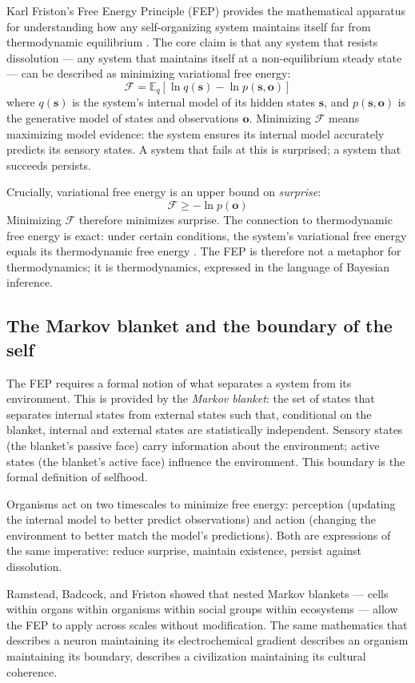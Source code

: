 \documentclass[12pt, a4paper]{article}
\newcommand{\FEP}{\mathcal{F}}
\begin{document}
Karl Friston's Free Energy Principle (FEP) provides the mathematical apparatus for
understanding how any self-organizing system maintains itself far from thermodynamic
equilibrium \citep{friston2010, friston2019}. The core claim is that any system that
resists dissolution --- any system that maintains itself at a non-equilibrium steady state
--- can be described as minimizing variational free energy:
\[
\FEP = \mathbb{E}_q\!\left[\ln q(\mathbf{s}) - \ln p(\mathbf{s},\mathbf{o})\right]
\]
where $q(\mathbf{s})$ is the system's internal model of its hidden states $\mathbf{s}$, and
$p(\mathbf{s},\mathbf{o})$ is the generative model of states and observations $\mathbf{o}$.
Minimizing $\FEP$ means maximizing model evidence: the system ensures its internal model
accurately predicts its sensory states. A system that fails at this is surprised; a system
that succeeds persists.

Crucially, variational free energy is an upper bound on \textit{surprise}:
\[
\FEP \geq -\ln p(\mathbf{o})
\]
Minimizing $\FEP$ therefore minimizes surprise. The connection to thermodynamic free energy
is exact: under certain conditions, the system's variational free energy equals its
thermodynamic free energy \citep{friston2019}. The FEP is therefore not a metaphor for
thermodynamics; it is thermodynamics, expressed in the language of Bayesian inference.

\subsection{The Markov blanket and the boundary of the self}

The FEP requires a formal notion of what separates a system from its environment. This is
provided by the \textit{Markov blanket}: the set of states that separates internal states
from external states such that, conditional on the blanket, internal and external states are
statistically independent. Sensory states (the blanket's passive face) carry information
about the environment; active states (the blanket's active face) influence the environment.
This boundary is the formal definition of selfhood.

Organisms act on two timescales to minimize free energy: perception (updating the internal
model to better predict observations) and action (changing the environment to better match
the model's predictions). Both are expressions of the same imperative: reduce surprise,
maintain existence, persist against dissolution.

Ramstead, Badcock, and Friston \citep{ramstead2018} showed that nested Markov blankets ---
cells within organs within organisms within social groups within ecosystems --- allow the FEP
to apply across scales without modification. The same mathematics that describes a neuron
maintaining its electrochemical gradient describes an organism maintaining its boundary,
describes a civilization maintaining its cultural coherence.
\end{document}
